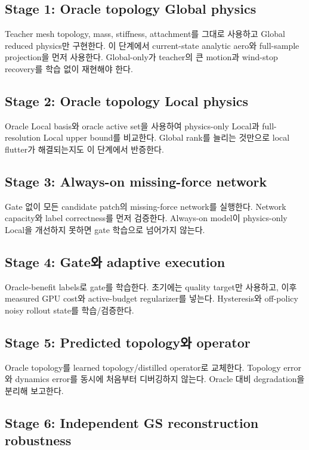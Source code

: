 \documentclass[11pt,a4paper]{article}
\begin{document}
\subsection{Stage 1: Oracle topology Global physics}

Teacher mesh topology, mass, stiffness, attachment를 그대로 사용하고
Global reduced physics만 구현한다.
이 단계에서 current-state analytic aero와 full-sample projection을 먼저 사용한다.
Global-only가 teacher의 큰 motion과 wind-stop recovery를 학습 없이 재현해야 한다.

\subsection{Stage 2: Oracle topology Local physics}

Oracle Local basis와 oracle active set을 사용하여
physics-only Local과 full-resolution Local upper bound를 비교한다.
Global rank를 늘리는 것만으로 local flutter가 해결되는지도 이 단계에서 반증한다.

\subsection{Stage 3: Always-on missing-force network}

Gate 없이 모든 candidate patch의 missing-force network를 실행한다.
Network capacity와 label correctness를 먼저 검증한다.
Always-on model이 physics-only Local을 개선하지 못하면 gate 학습으로 넘어가지 않는다.

\subsection{Stage 4: Gate와 adaptive execution}

Oracle-benefit labels로 gate를 학습한다.
초기에는 quality target만 사용하고,
이후 measured GPU cost와 active-budget regularizer를 넣는다.
Hysteresis와 off-policy noisy rollout state를 학습/검증한다.

\subsection{Stage 5: Predicted topology와 operator}

Oracle topology를 learned topology/distilled operator로 교체한다.
Topology error와 dynamics error를 동시에 처음부터 디버깅하지 않는다.
Oracle 대비 degradation을 분리해 보고한다.

\subsection{Stage 6: Independent GS reconstruction robustness}
\end{document}
